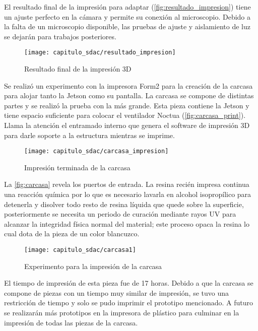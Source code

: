 El resultado final de la impresión para adaptar
(\autoref{fig:resultado_impresion}) tiene un ajuste perfecto en la cámara y
permite su conexión al microscopio. Debido a la falta de  un microscopio
disponible, las pruebas de ajuste y aislamiento de luz se dejarán para trabajos
posteriores.

\begin{figure}[H]
    \centering
    \texttt{[image: capitulo\_sdac/resultado\_impresion]}
    \caption{Resultado final de la impresión 3D}\label{fig:resultado_impresion}
\end{figure}

Se realizó un experimento con la impresora Form2 para la creación de la carcasa
para alojar tanto la Jetson como su pantalla. La carcasa se compone de distintas
partes y se realizó la prueba con la más grande. Esta pieza contiene la Jetson y
tiene espacio suficiente para colocar el ventilador Noctua
(\autoref{fig:carcasa_print}). Llama la atención el entramado interno que genera
el software de impresión 3D para darle soporte a la estructura mientras se
imprime.

\begin{figure}[H]
    \centering
    \texttt{[image: capitulo\_sdac/carcasa\_impresion]}
    \caption{Impresión terminada de la carcasa}\label{fig:carcasa_print}
\end{figure}

La \autoref{fig:carcasa} revela los puertos de entrada. La resina recién impresa
continua una reacción química por lo que es necesario lavarla en alcohol
isopropílico para detenerla y disolver todo resto de resina líquida que quede
sobre la superficie, posteriormente se necesita un periodo de curación mediante
rayos UV para alcanzar la integridad física normal del material; este proceso
opaca la resina lo cual dota de la pieza de un color blancuzco.

\begin{figure}[H]
    \centering
    \texttt{[image: capitulo\_sdac/carcasa1]}
    \caption{Experimento para la impresión de la carcasa}\label{fig:carcasa}
\end{figure}

El tiempo de impresión de esta pieza fue de 17 horas. Debido a que la carcasa se
compone de piezas con un tiempo muy similar de impresión, se tuvo una
restricción de tiempo y solo se pudo imprimir el prototipo mencionado. A futuro
se realizarán más prototipos en la impresora de plástico para culminar en la
impresión de todas las piezas de la carcasa.

